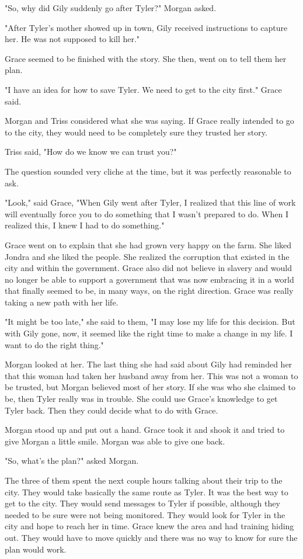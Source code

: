 \documentclass[courier]{sffms}
\begin{document}
"So, why did Gily suddenly go after Tyler?" Morgan asked.

"After Tyler's mother showed up in town, Gily received
instructions to capture her. He was not supposed to kill
her."

Grace seemed to be finished with the story. She then,
went on to tell them her plan.

"I have an idea for how to save Tyler. We need to get to
the city first." Grace said.

Morgan and Triss considered what she was saying. If Grace
really intended to go to the city, they would need to be 
completely sure they trusted her story.

Triss said, "How do we know we can trust you?"

The question sounded very cliche at the time, but it was
perfectly reasonable to ask.

"Look," said Grace, "When Gily went after Tyler, I realized
that this line of work will eventually force you to do
something that I wasn't prepared to do. When I realized
this, I knew I had to do something."

Grace went on to explain that she had grown very happy
on the farm. She liked Jondra and she liked the people.
She realized the corruption that existed in the city and
within the government. Grace also did not believe in
slavery and would no longer be able to support a
government that was now embracing it in a world
that finally seemed to be, in many ways, on the right
direction. Grace was really taking a new path with her
life.

"It might be too late," she said to them, "I may lose my
life for this decision. But with Gily gone, now, it seemed
like the right time to make a change in my life. I want
to do the right thing."

Morgan looked at her. The last thing she had said
about Gily had reminded her that this woman had
taken her husband away from her. This was not a
woman to be trusted, but Morgan believed most
of her story. If she was who she claimed to be,
then Tyler really was in trouble. She could use
Grace's knowledge to get Tyler back. Then they
could decide what to do with Grace.

Morgan stood up and put out a hand. Grace took
it and shook it and tried to give Morgan a little
smile. Morgan was able to give one back.

"So, what's the plan?" asked Morgan.

The three of them spent the next couple hours
talking about their trip to the city. They would take
basically the same route as Tyler. It was the best
way to get to the city. They would send messages
to Tyler if possible, although they needed to be sure
were not being monitored. They would look for Tyler
in the city and hope to reach her in time. Grace knew
the area and had training hiding out. They would
have to move quickly and there was no way to know
for sure the plan would work.
\end{document}
